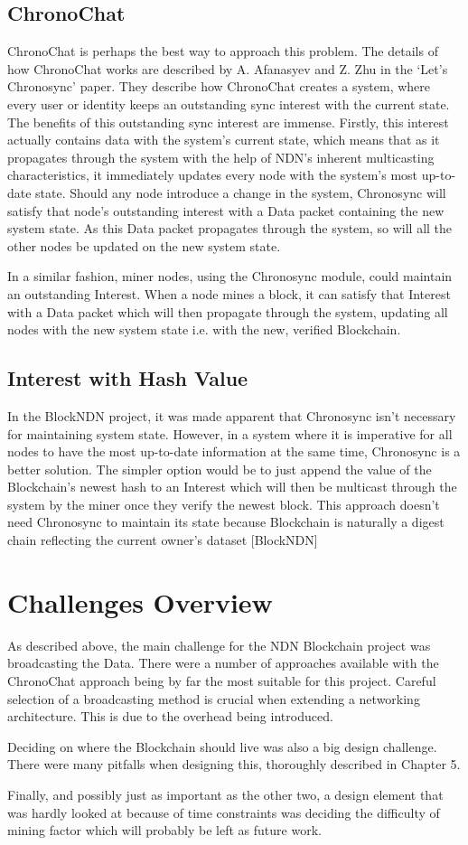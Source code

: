 \subsection{ChronoChat}
ChronoChat is perhaps the best way to approach this problem. The details of how ChronoChat works are described by A. Afanasyev and Z. Zhu in the `Let's Chronosync' paper. They describe how ChronoChat creates a system, where every user or identity keeps an outstanding sync interest\cite{052} with the current state. The benefits of this outstanding sync interest are immense. Firstly, this interest actually contains data with the system's current state, which means that as it propagates through the system with the help of NDN's inherent multicasting characteristics, it immediately updates every node with the system's most up-to-date state. Should any node introduce a change in the system, Chronosync will satisfy that node's outstanding interest with a Data packet containing the new system state. As this Data packet propagates through the system, so will all the other nodes be updated on the new system state.\par
In a similar fashion, miner nodes, using the Chronosync module, could maintain an outstanding Interest. When a node mines a block, it can satisfy that Interest with a Data packet which will then propagate through the system, updating all nodes with the new system state i.e. with the new, verified Blockchain.

\subsection{Interest with Hash Value}
In the BlockNDN project, it was made apparent that Chronosync isn't necessary for maintaining system state. However, in a system where it is imperative for all nodes to have the most up-to-date information at the same time, Chronosync is a better solution. The simpler option would be to just append the value of the Blockchain's newest hash to an Interest which will then be multicast through the system by the miner once they verify the newest block. This approach doesn't need Chronosync to maintain its state because Blockchain is naturally a digest chain reflecting the current owner's dataset [BlockNDN]
\section{Challenges Overview}
As described above, the main challenge for the NDN Blockchain project was broadcasting the Data. There were a number of approaches available with the ChronoChat approach being by far the most suitable for this project. Careful selection of a broadcasting method is crucial when extending a networking architecture. This is due to the overhead being introduced. \par 
Deciding on where the Blockchain should live was also a big design challenge. There were many pitfalls when designing this, thoroughly described in Chapter 5. \par 
Finally, and possibly just as important as the other two, a design element that was hardly looked at because of time constraints was deciding the difficulty of mining factor which will probably be left as future work.